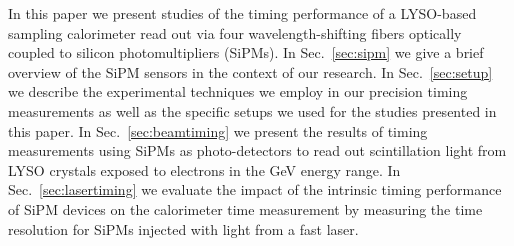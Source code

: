 In this paper we present studies of the timing performance of a
LYSO-based sampling calorimeter read out via four wavelength-shifting fibers
optically coupled to silicon photomultipliers (SiPMs). 
In Sec.~\ref{sec:sipm} we give a brief overview of the SiPM sensors in the
context of our research. In Sec.~\ref{sec:setup} we describe the experimental
techniques we employ in our precision timing measurements as well as the
specific setups we used for the studies presented in this paper. 
In Sec.~\ref{sec:beamtiming} we present the results of timing measurements using 
SiPMs as photo-detectors to read out scintillation light from LYSO crystals exposed 
to electrons in the GeV energy range. In Sec.~\ref{sec:lasertiming} we evaluate the
impact of the intrinsic timing performance of SiPM devices on the calorimeter 
time measurement by measuring the time resolution for SiPMs injected with
light from a fast laser.
